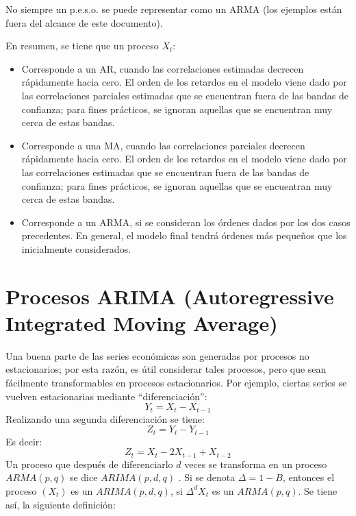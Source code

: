 \begin{observacion}
No siempre un p.e.s.o. se puede representar como un ARMA (los ejemplos est\'{a}n fuera del alcance de este documento).
\end{observacion}

\begin{observacion}
 En resumen, se tiene que un proceso $X_{t}$:
\begin{itemize}
\item Corresponde a un AR, cuando las correlaciones estimadas decrecen r\'{a}pidamente hacia cero. El orden de los retardos en el modelo viene dado por las correlaciones parciales estimadas que se encuentran fuera de las bandas de confianza; para fines pr\'{a}cticos, se ignoran aquellas que se encuentran muy cerca de estas bandas.
\item Corresponde a una MA, cuando las correlaciones parciales decrecen r\'{a}pidamente hacia cero. El orden de los retardos en el modelo viene dado por las correlaciones estimadas que se encuentran fuera de las bandas de confianza; para fines pr\'{a}cticos, se ignoran aquellas que se encuentran muy cerca de estas bandas.
\item Corresponde a un ARMA, si se consideran los \'{o}rdenes dados por los dos casos precedentes. En general, el modelo final tendr\'{a} \'{o}rdenes m\'{a}s peque\~{n}os que los inicialmente considerados.
\end{itemize}
\end{observacion}


\section{Procesos ARIMA (Autoregressive Integrated Moving Average)}

Una buena parte de las series econ\'{o}micas son generadas por procesos no estacionarios; por esta raz\'{o}n, es \'{u}til considerar tales procesos, pero que sean f\'{a}cilmente transformables en procesos estacionarios. Por ejemplo, ciertas series se vuelven estacionarias mediante ``diferenciaci\'{o}n'':
\[
Y_{t}=X_{t}-X_{t-1}
\]
Realizando una segunda diferenciaci\'{o}n se tiene:
\[
Z_{t}=Y_{t}-Y_{t-1}
\]
Es decir:
\[
Z_{t}=X_{t}-2X_{t-1}+X_{t-2}
\]
Un proceso que despu\'{e}s de diferenciarlo $d$ veces se transforma en un proceso $ARMA (p,q)$ se dice $ARIMA (p,d,q)$ . Si se denota $\Delta= 1-B$, entonces el proceso $(X_{t})$ es un $ARIMA (p,d,q)$, si ${\Delta }^{d}X_{t}$ es un $ARMA (p,q)$. Se tiene as\'{i}, la siguiente definici\'{o}n:

